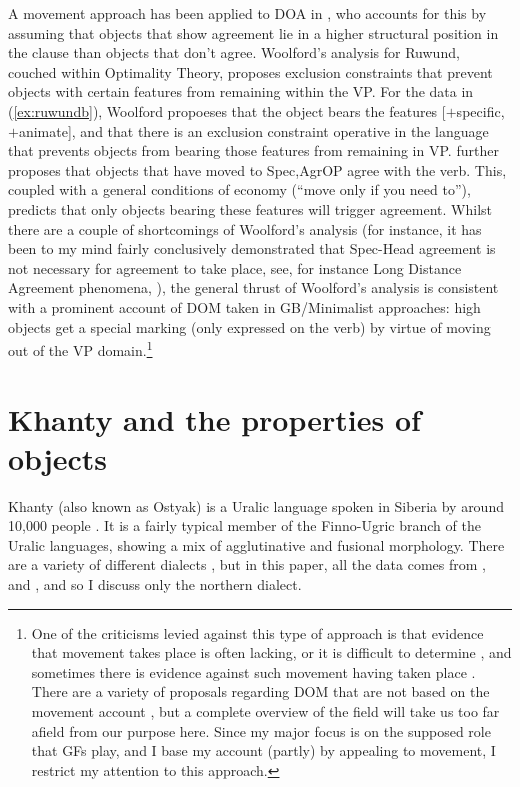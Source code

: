 \documentclass[output=paper
,modfonts
,nonflat]{langsci/langscibook}
\begin{document}
A movement approach has been applied to DOA in \citet{woolford1999,woolford2001}, who accounts for this by assuming that objects that show agreement lie in a higher structural position in the clause than objects that don't agree.
Woolford's analysis for Ruwund, couched within Optimality Theory, proposes exclusion constraints that prevent objects with certain features from remaining within the VP.
For the data in (\ref{ex:ruwundb}), Woolford propoeses that the object bears the features [$+$specific,$+$animate], and that there is an exclusion constraint operative in the language that prevents objects from bearing those features from remaining in VP.
 \citeauthor{woolford2001} further proposes that objects that have moved to Spec,AgrOP agree with the verb. 
This, coupled with a general conditions of economy (``move only if you need to''), predicts that only objects bearing these features will trigger agreement. 
Whilst there are a couple of shortcomings of Woolford's analysis (for instance, it has been to my mind fairly conclusively demonstrated that Spec-Head agreement is not necessary for agreement to take place, see, for instance Long Distance Agreement phenomena, \citealt{polinskypotsdam2001}), the general thrust of Woolford's analysis is consistent with a prominent account of DOM taken in GB/Minimalist approaches: high objects get a special marking (only expressed on the verb) by virtue of moving out of the VP domain.\footnote{One of the criticisms levied against this type of approach is that evidence that movement takes place is often lacking, or it is difficult to determine \citep{dn2011,Baker2015}, and sometimes there is evidence against such movement having taken place \citep{kalinweisser2017}. 
There are a variety of proposals regarding DOM that are not based on the movement account \citep{bossong1991,aissen2003,deswart2007,keinemuller2014,kalin2017}, but a complete overview of the field will take us too far afield from our purpose here. Since my major focus is on the supposed role that GFs play, and I base my account (partly) by appealing to movement, I restrict my attention to this approach.}





\section{Khanty and the properties of objects}\label{Khanty}


Khanty (also known as Ostyak) is a Uralic language spoken in Siberia by around 10,000 people \citep{ethnologue}.
It is a fairly typical member of the Finno-Ugric branch of the Uralic languages, showing a mix of agglutinative and fusional morphology.
There are a variety of different dialects \citep{ostyakgrammar}, but in this paper, all the data comes from \citet{nikolaeva1999}, \citet{nikolaeva2001} and \citet{dn2011}, and so I discuss only the northern dialect.
\end{document}
